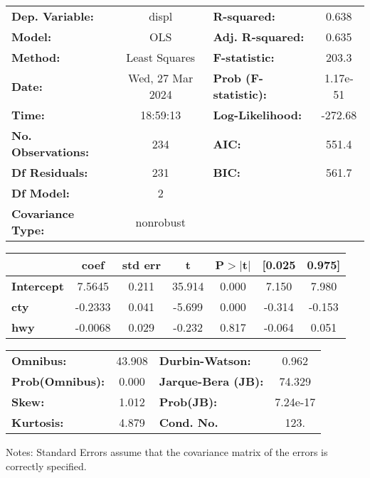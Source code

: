 \begin{center}
\begin{tabular}{lclc}
\toprule
\textbf{Dep. Variable:}    &      displ       & \textbf{  R-squared:         } &     0.638   \\
\textbf{Model:}            &       OLS        & \textbf{  Adj. R-squared:    } &     0.635   \\
\textbf{Method:}           &  Least Squares   & \textbf{  F-statistic:       } &     203.3   \\
\textbf{Date:}             & Wed, 27 Mar 2024 & \textbf{  Prob (F-statistic):} &  1.17e-51   \\
\textbf{Time:}             &     18:59:13     & \textbf{  Log-Likelihood:    } &   -272.68   \\
\textbf{No. Observations:} &         234      & \textbf{  AIC:               } &     551.4   \\
\textbf{Df Residuals:}     &         231      & \textbf{  BIC:               } &     561.7   \\
\textbf{Df Model:}         &           2      & \textbf{                     } &             \\
\textbf{Covariance Type:}  &    nonrobust     & \textbf{                     } &             \\
\bottomrule
\end{tabular}
\begin{tabular}{lcccccc}
                   & \textbf{coef} & \textbf{std err} & \textbf{t} & \textbf{P$> |$t$|$} & \textbf{[0.025} & \textbf{0.975]}  \\
\midrule
\textbf{Intercept} &       7.5645  &        0.211     &    35.914  &         0.000        &        7.150    &        7.980     \\
\textbf{cty}       &      -0.2333  &        0.041     &    -5.699  &         0.000        &       -0.314    &       -0.153     \\
\textbf{hwy}       &      -0.0068  &        0.029     &    -0.232  &         0.817        &       -0.064    &        0.051     \\
\bottomrule
\end{tabular}
\begin{tabular}{lclc}
\textbf{Omnibus:}       & 43.908 & \textbf{  Durbin-Watson:     } &    0.962  \\
\textbf{Prob(Omnibus):} &  0.000 & \textbf{  Jarque-Bera (JB):  } &   74.329  \\
\textbf{Skew:}          &  1.012 & \textbf{  Prob(JB):          } & 7.24e-17  \\
\textbf{Kurtosis:}      &  4.879 & \textbf{  Cond. No.          } &     123.  \\
\bottomrule
\end{tabular}
\end{center}

Notes: \newline
 [1] Standard Errors assume that the covariance matrix of the errors is correctly specified.